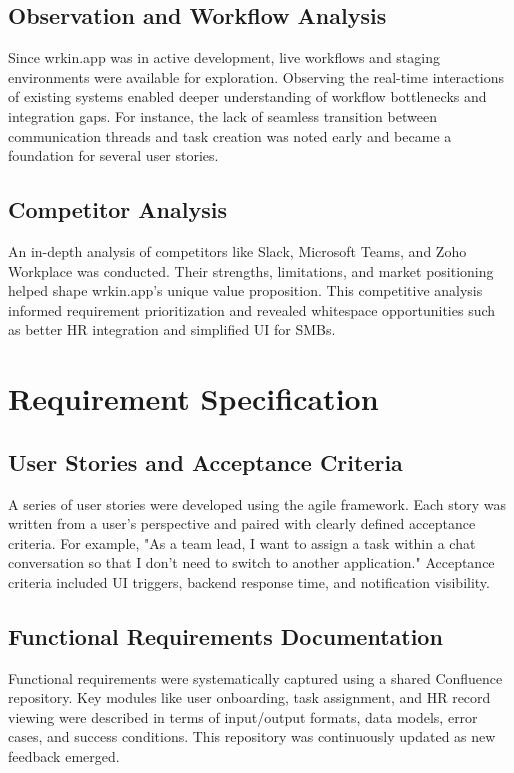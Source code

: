 \subsection{Observation and Workflow Analysis}

Since wrkin.app was in active development, live workflows and staging environments were available for exploration. Observing the real-time interactions of existing systems enabled deeper understanding of workflow bottlenecks and integration gaps. For instance, the lack of seamless transition between communication threads and task creation was noted early and became a foundation for several user stories.

\subsection{Competitor Analysis}

An in-depth analysis of competitors like Slack, Microsoft Teams, and Zoho Workplace was conducted. Their strengths, limitations, and market positioning helped shape wrkin.app's unique value proposition. This competitive analysis informed requirement prioritization and revealed whitespace opportunities such as better HR integration and simplified UI for SMBs.

\section{Requirement Specification}

\subsection{User Stories and Acceptance Criteria}

A series of user stories were developed using the agile framework. Each story was written from a user's perspective and paired with clearly defined acceptance criteria. For example, "As a team lead, I want to assign a task within a chat conversation so that I don’t need to switch to another application." Acceptance criteria included UI triggers, backend response time, and notification visibility.

\subsection{Functional Requirements Documentation}

Functional requirements were systematically captured using a shared Confluence repository. Key modules like user onboarding, task assignment, and HR record viewing were described in terms of input/output formats, data models, error cases, and success conditions. This repository was continuously updated as new feedback emerged.

